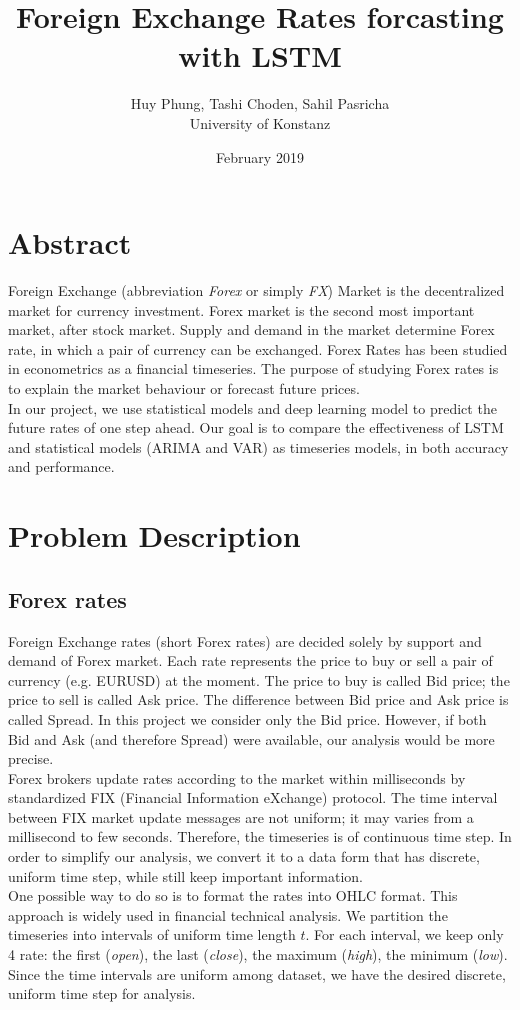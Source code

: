 \documentclass[11pt]{article}
\title{Foreign Exchange Rates forcasting with LSTM}
\author{Huy Phung, Tashi Choden, Sahil Pasricha
  \\University of Konstanz}
\date{February 2019}
\begin{document}
\maketitle
\pagebreak
\tableofcontents
\pagebreak

\section{Abstract}
Foreign Exchange (abbreviation \textit{Forex} or simply \textit{FX}) Market is
the decentralized market for currency investment. Forex market is the second
most important market, after stock market. Supply and demand in the market
determine Forex rate, in which a pair of currency can be exchanged. Forex Rates
has been studied in econometrics as a financial timeseries. The purpose of
studying Forex rates is to explain the market behaviour or forecast future
prices.\\
In our project, we use statistical models and deep learning model to predict the
future rates of one step ahead. Our goal is to compare the effectiveness of LSTM
and statistical models (ARIMA and VAR) as timeseries models, in both accuracy
and performance.


\section{Problem Description}
\subsection{Forex rates}
Foreign Exchange rates (short Forex rates) are decided solely by support and
demand of Forex market. Each rate represents the price to buy or sell a pair of
currency (e.g. EURUSD) at the moment. The price to buy is called Bid price; the
price to sell is called Ask price. The difference between Bid price and Ask
price is called Spread. In this project we consider only the Bid price. However,
if both Bid and Ask (and therefore Spread) were available, our analysis would be
more precise.\\
Forex brokers update rates according to the market within milliseconds by
standardized FIX (Financial Information eXchange) protocol. The time interval
between FIX market update messages are not uniform; it may varies from a
millisecond to few seconds. Therefore, the timeseries is of continuous time
step. In order to simplify our analysis, we convert it to a data form that has
discrete, uniform time step, while still keep important information.\\
One possible way to do so is to format the rates into OHLC format. This approach
is widely used in financial technical analysis. We partition the timeseries into
intervals of uniform time length $t$. For each interval, we keep only 4 rate:
the first (\textit{open}), the last (\textit{close}), the maximum
(\textit{high}), the minimum (\textit{low}). Since the time intervals are
uniform among dataset, we have the desired discrete, uniform time step for
analysis.
\end{document}
